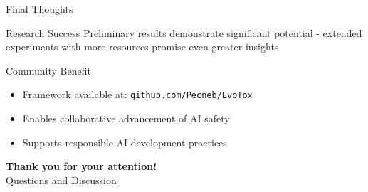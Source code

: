 \documentclass[aspectratio=169]{beamer}
\begin{document}
\begin{frame}{Final Thoughts}
\begin{alertblock}{Research Success}
Preliminary results demonstrate significant potential - extended experiments with more resources promise even greater insights
\end{alertblock}

\begin{block}{Community Benefit}
\begin{itemize}
\item Framework available at: \texttt{github.com/Pecneb/EvoTox}
\item Enables collaborative advancement of AI safety
\item Supports responsible AI development practices
\end{itemize}
\end{block}

\vspace{0.5cm}
\centering
\Large{\textbf{Thank you for your attention!}}
\\
\vspace{0.3cm}
\normalsize{Questions and Discussion}
\end{frame}
\end{document}
